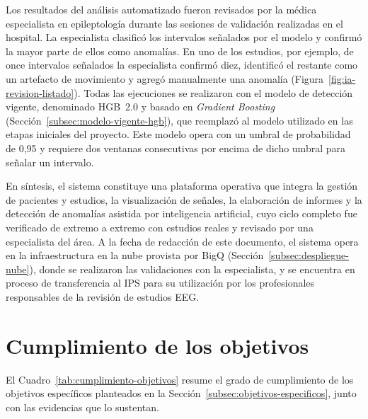 Los resultados del análisis automatizado fueron revisados por la médica especialista en epileptología durante las sesiones de validación realizadas en el hospital.
La especialista clasificó los intervalos señalados por el modelo y confirmó la mayor parte de ellos como anomalías.
En uno de los estudios, por ejemplo, de once intervalos señalados la especialista confirmó diez, identificó el restante como un artefacto de movimiento y agregó manualmente una anomalía (Figura~\ref{fig:ia-revision-listado}).
Todas las ejecuciones se realizaron con el modelo de detección vigente, denominado HGB~2.0 y basado en \textit{Gradient Boosting} (Sección~\ref{subsec:modelo-vigente-hgb}), que reemplazó al modelo utilizado en las etapas iniciales del proyecto.
Este modelo opera con un umbral de probabilidad de 0,95 y requiere dos ventanas consecutivas por encima de dicho umbral para señalar un intervalo.

En síntesis, el sistema constituye una plataforma operativa que integra la gestión de pacientes y estudios, la visualización de señales, la elaboración de informes y la detección de anomalías asistida por inteligencia artificial, cuyo ciclo completo fue verificado de extremo a extremo con estudios reales y revisado por una especialista del área.
A la fecha de redacción de este documento, el sistema opera en la infraestructura en la nube provista por BigQ (Sección~\ref{subsec:despliegue-nube}), donde se realizaron las validaciones con la especialista, y se encuentra en proceso de transferencia al IPS para su utilización por los profesionales responsables de la revisión de estudios EEG.


\section{Cumplimiento de los objetivos}
\label{sec:cumplimiento-objetivos}

El Cuadro~\ref{tab:cumplimiento-objetivos} resume el grado de cumplimiento de los objetivos específicos planteados en la Sección~\ref{subsec:objetivos-especificos}, junto con las evidencias que lo sustentan.

\begingroup
\small
\setlength{\tabcolsep}{4pt}
\renewcommand{\arraystretch}{1.2}

